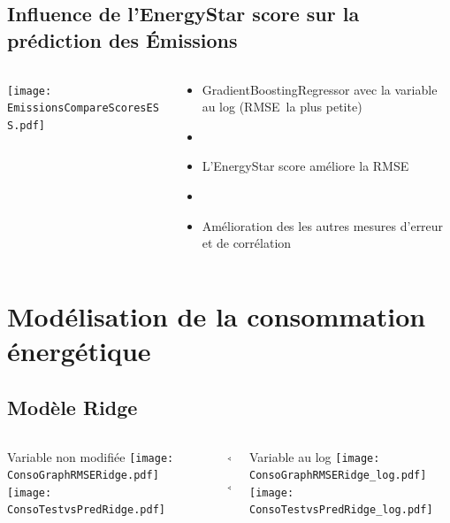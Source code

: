 \documentclass[8pt,aspectratio=169,hyperref={unicode=true}]{beamer}
\begin{document}
\subsection{Influence de l'EnergyStar score sur la prédiction des Émissions}
\begin{frame}{\insertsubsection}
  \begin{columns}
    \begin{column}{.6\textwidth}
      \centering
      \texttt{[image: EmissionsCompareScoresESS.pdf]}
    \end{column}
    \begin{column}{.4\textwidth}
      \begin{itemize}
        \item GradientBoostingRegressor avec la variable au log (RMSE la plus petite)
        \item[]
        \item L'EnergyStar score améliore la RMSE
        \item[]
        \item Amélioration des les autres mesures d'erreur et de corrélation
      \end{itemize}
    \end{column}
  \end{columns}
\end{frame}

\section[Modélisation consommation]{Modélisation de la consommation énergétique}
\subsection{Modèle Ridge}
\begin{frame}{\insertsubsection}
  \begin{columns}[t]
    \begin{column}{.33\textwidth}
      \centering Variable non modifiée
      \texttt{[image: ConsoGraphRMSERidge.pdf]}
      \texttt{[image: ConsoTestvsPredRidge.pdf]}
    \end{column}
    \begin{column}{.33\textwidth}
      $\Longleftarrow$
      \scriptsize
      {\centering
        }
      

      \normalsize
      $\Longleftarrow$

      \raggedleft{$\Longrightarrow$}
      \scriptsize
      {\centering
        }
      

      \normalsize
      \raggedleft{$\Longrightarrow$}
    \end{column}
    \begin{column}{.33\textwidth}
      \centering Variable au log
      \texttt{[image: ConsoGraphRMSERidge\_log.pdf]}
      \texttt{[image: ConsoTestvsPredRidge\_log.pdf]}
    \end{column}
  \end{columns}
\end{frame}
\end{document}
